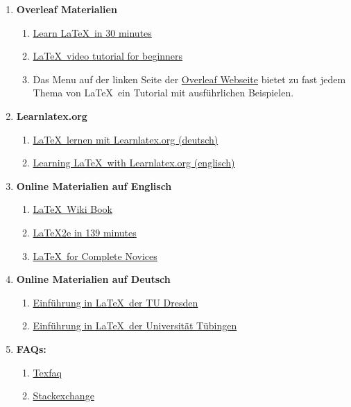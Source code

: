\begin{enumerate}
\item \textbf{Overleaf Materialien}
\begin{enumerate}
\item \href{https://www.overleaf.com/learn/latex/Learn_LaTeX_in_30_minutes}{Learn \LaTeX\ in 30 minutes}
\item \href{https://www.overleaf.com/learn/latex/LaTeX_video_tutorial_for_beginners_(video_1)}{\LaTeX\ video tutorial for beginners}
\item Das Menu auf der linken Seite der \href{https://www.overleaf.com}{Overleaf Webseite} bietet zu fast jedem Thema von \LaTeX\ ein
Tutorial mit ausführlichen Beispielen. 
\end{enumerate}
\item \textbf{Learnlatex.org}
\begin{enumerate}
\item \href{https://www.learnlatex.org/de/}{\LaTeX\ lernen mit Learnlatex.org (deutsch)}
\item \href{https://www.learnlatex.org/en/}{Learning \LaTeX\ with Learnlatex.org (englisch)}
\end{enumerate}
\item \textbf{Online Materialien auf Englisch}
\begin{enumerate}
\item \href{https://en.wikibooks.org/wiki/LaTeX}{\LaTeX\ Wiki Book}
\item \href{https://tobi.oetiker.ch/lshort/lshort.pdf}{{\LaTeX}2e in 139 minutes}
\item \href{https://www.dickimaw-books.com/latex/novices/novices-report.pdf}{\LaTeX\ for Complete Novices}
\end{enumerate}
\pagebreak%
\item \textbf{Online Materialien auf Deutsch}
\begin{enumerate}
\item \href{https://tu-dresden.de/mn/math/stochastik/das-institut/beschaeftigte/jan-rudl/ressourcen/dateien/latex_win/LaTeX-Kurs.pdf?lang=en}{Einführung in \LaTeX\ der TU Dresden}

\item \href{http://www.nagel-net.de/Latex/DOKU/Latexkurs_Skript.pdf}{Einführung in \LaTeX\ der Universität Tübingen}
\end{enumerate}

\item \textbf{FAQs:}
\begin{enumerate}
\item \href{https://texfaq.org/}{Texfaq}
\item \href{https://tex.stackexchange.com/}{Stackexchange}
\end{enumerate}


\end{enumerate}
